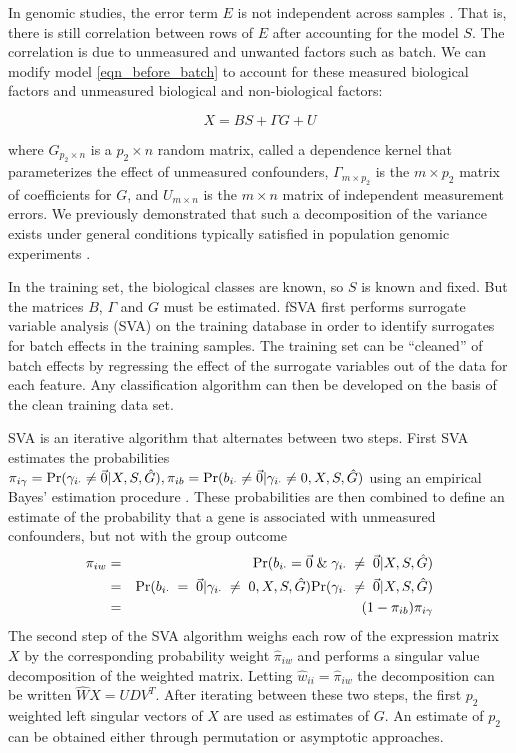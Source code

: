 \documentclass{bioinfo}
\newcommand{\p}{{\rm Pr}}
\begin{document}
In genomic studies, the error term $E$ is not independent across samples \cite{Johnson2007b,Leek2007,Leek2008,Walker2008,Friguet2009,Leek2010,Gagnon-Bartsch2011}.  That is, there is still correlation between rows of $E$ after accounting for the model $S$. The correlation is due to unmeasured and unwanted factors such as batch. We can modify model \ref{eqn_before_batch} to account for these measured biological factors and unmeasured biological and non-biological factors:

\begin{equation}
X = BS + \Gamma G + U
\label{full_expression_matrix}
\end{equation}

where $G_{p_2 \times n}$ is a $p_2 \times n$ random matrix, called a dependence kernel \cite{Leek2008} that parameterizes the effect of unmeasured confounders, $\Gamma_{m \times p_2}$ is the $m \times p_2$ matrix of coefficients for $G$, and $U_{m\times n}$ is the $m \times n$ matrix of independent measurement errors. We previously demonstrated that such a decomposition of the variance exists under general conditions typically satisfied in population genomic experiments \cite{Leek2008}. 

In the training set, the biological classes are known, so $S$ is known and fixed. But the matrices $B$, $\Gamma$ and $G$ must be estimated. fSVA first performs surrogate variable analysis (SVA) on the training database in order to identify surrogates for batch effects in the training samples. The training set can be ``cleaned'' of batch effects by regressing the effect of the surrogate variables out of the data for each feature. Any classification algorithm can then be developed on the basis of the clean training data set. 

SVA is an iterative algorithm that alternates between two steps. First SVA estimates the probabilities $\pi_{i\gamma} = \p(\gamma_{i\cdot} \neq \vec{0}| X, S, \hat{G}), \pi_{ib} = \p(b_{i\cdot} \neq \vec{0}| \gamma_{i\cdot} \neq 0, X, S, \hat{G})$ using an empirical Bayes' estimation procedure \cite{Leek2008,Efron2004b,Storey2005}. These probabilities are then combined to define an estimate of the probability that a gene is associated with unmeasured confounders, but not with the group outcome
\begin{eqnarray*}
\pi_{iw} &=& \p(b_{i\cdot} = \vec{0} \; \& \; \gamma_{i\cdot} \;\neq\; \vec{0} | X,S,\hat{G})\\
& = & \p(b_{i\cdot} \; = \; \vec{0}| \gamma_{i\cdot} \; \neq\; 0, X, S, \hat{G}) \p(\gamma_{i\cdot} \; \neq\; \vec{0}| X, S, \hat{G})\\
&=& (1-\pi_{ib})\pi_{i\gamma}
\end{eqnarray*}
The second step of the SVA algorithm weighs each row of the expression matrix $X$ by the corresponding probability weight $\hat{\pi}_{iw}$ and performs a singular value decomposition of the weighted matrix. Letting $\hat{w}_{ii} = \hat{\pi}_{iw}$ the decomposition can be written $\hat{W}X = UDV^T$. After iterating between these two steps, the first $p_2$ weighted left singular vectors of $X$ are used as estimates of $G$. An estimate of $p_2$ can be obtained either through permutation \cite{Buja1992} or asymptotic \cite{Leek2011} approaches. 
\end{document}
